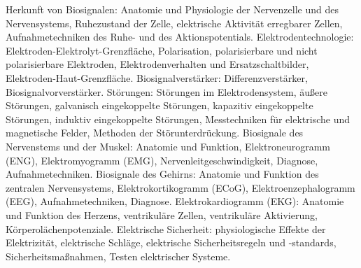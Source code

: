 \begin{course}
\begin{content}
Herkunft von Biosignalen: Anatomie und Physiologie der Nervenzelle und des Nervensystems, Ruhezustand der Zelle, elektrische Aktivität erregbarer Zellen, Aufnahmetechniken des Ruhe- und des Aktionspotentials.\newline
\newline
 Elektrodentechnologie: Elektroden-Elektrolyt-Grenzfläche, Polarisation, polarisierbare und nicht polarisierbare Elektroden, Elektrodenverhalten und Ersatzschaltbilder, Elektroden-Haut-Grenzfläche.\newline
\newline
 Biosignalverstärker: Differenzverstärker, Biosignalvorverstärker.\newline
\newline
 Störungen: Störungen im Elektrodensystem, äußere Störungen, galvanisch eingekoppelte Störungen, kapazitiv eingekoppelte Störungen, induktiv eingekoppelte Störungen, Messtechniken für elektrische und magnetische Felder, Methoden der Störunterdrückung.\newline
\newline
 Biosignale des Nervenstems und der Muskel: Anatomie und Funktion, Elektroneurogramm (ENG), Elektromyogramm (EMG), Nervenleitgeschwindigkeit, Diagnose, Aufnahmetechniken.\newline
\newline
 Biosignale des Gehirns: Anatomie und Funktion des zentralen Nervensystems, Elektrokortikogramm (ECoG), Elektroenzephalogramm (EEG), Aufnahmetechniken, Diagnose.\newline
\newline
 Elektrokardiogramm (EKG): Anatomie und Funktion des Herzens, ventrikuläre Zellen, ventrikuläre Aktivierung, Körperolächenpotenziale.\newline
\newline
 Elektrische Sicherheit: physiologische Effekte der Elektrizität, elektrische Schläge, elektrische Sicherheitsregeln und -standards, Sicherheitsmaßnahmen, Testen elektrischer Systeme.


\end{content}







\end{course}